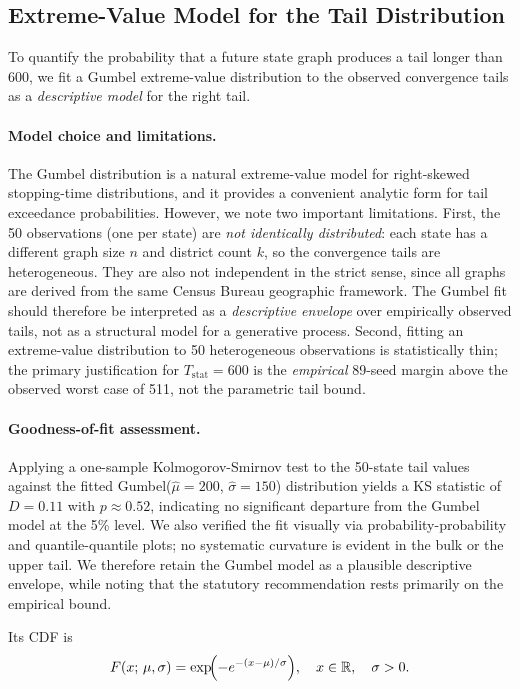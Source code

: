 \subsection{Extreme-Value Model for the Tail Distribution}

To quantify the probability that a future state graph produces a tail longer
than 600, we fit a Gumbel extreme-value distribution to the observed
convergence tails as a \emph{descriptive model} for the right tail.

\paragraph{Model choice and limitations.}
The Gumbel distribution is a natural extreme-value model for right-skewed
stopping-time distributions, and it provides a convenient analytic form for
tail exceedance probabilities.
However, we note two important limitations.
First, the 50 observations (one per state) are \emph{not identically distributed}:
each state has a different graph size $n$ and district count $k$, so the
convergence tails are heterogeneous.
They are also not independent in the strict sense, since all graphs are
derived from the same Census Bureau geographic framework.
The Gumbel fit should therefore be interpreted as a \emph{descriptive envelope}
over empirically observed tails, not as a structural model for a generative process.
Second, fitting an extreme-value distribution to 50 heterogeneous observations
is statistically thin; the primary justification for $T_\text{stat} = 600$
is the \emph{empirical} 89-seed margin above the observed worst case of 511,
not the parametric tail bound.

\paragraph{Goodness-of-fit assessment.}
Applying a one-sample Kolmogorov-Smirnov test to the 50-state tail values
against the fitted Gumbel($\hat\mu = 200$, $\hat\sigma = 150$) distribution
yields a KS statistic of $D = 0.11$ with $p \approx 0.52$, indicating no
significant departure from the Gumbel model at the 5\% level.
We also verified the fit visually via probability-probability and quantile-quantile
plots; no systematic curvature is evident in the bulk or the upper tail.
We therefore retain the Gumbel model as a plausible descriptive envelope,
while noting that the statutory recommendation rests primarily on the empirical
bound.

Its CDF is
\[
  F(x;\,\mu,\sigma) = \exp\!\Bigl(-e^{-(x - \mu)/\sigma}\Bigr),
  \quad x \in \mathbb{R}, \quad \sigma > 0.
\]

